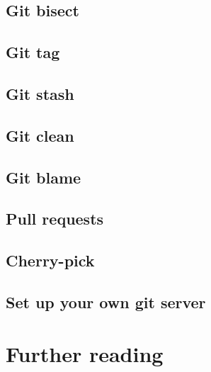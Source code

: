 \documentclass[10pt,a4paper]{beamer}
\begin{document}
\subsection{Git bisect}
\begin{frame}

\end{frame}

\subsection{Git tag}
\begin{frame}

\end{frame}

\subsection{Git stash}
\begin{frame}

\end{frame}

\subsection{Git clean}
\begin{frame}

\end{frame}

\subsection{Git blame}
\begin{frame}

\end{frame}

\subsection{Pull requests}
\begin{frame}

\end{frame}

\subsection{Cherry-pick}
\begin{frame}

\end{frame}

\subsection{Set up your own git server}
\begin{frame}

\end{frame}

\section{Further reading}
\begin{frame}

\end{frame}
\end{document}
